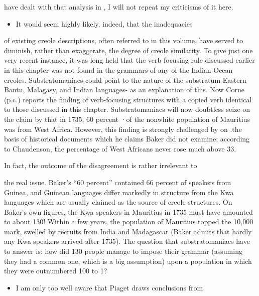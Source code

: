 
have dealt with that analysis in \citet{Bickerton1980}, I will not repeat my criticisms of it here.

\begin{itemize}
\item It would seem highly likely, indeed, that the inadequacies
\end{itemize}

of existing creole descriptions, often referred to in this volume, have served to diminish, rather than exaggerate, the degree of creole simi\-larity. To give just one very recent instance, it was long held that the verb-focusing rule discussed earlier in this chapter was not found in the grammars of any of the Indian Ocean creoles. Substratomaniacs could point to the nature of the substratum-Eastern Bantu, Malagasy, and Indian languages- as an explanation of this. Now Corne (p.c.) reports the finding of verb-focusing structures with a copied verb identical to those discussed in this chapter. Substratomaniacs will now doubtless seize on the claim by \citet{Baker1976} that in 1735, 60 percent ·of the nonwhite population of Mauritius was from West Africa. However, this finding is strongly challenged by \citet{Chaudenson1979} on .the basis of historical documents which he claims Baker did not examine; according to Chaudenson, the percentage of West Africans never rose much above 33.

In fact, the outcome of the disagreement is rather irrelevant to

the real issue. Baker's ``60 percent'' contained 66 percent of speakers from Guinea, and Guinean languages differ markedly in structure from the Kwa languages which are usually claimed as the source of creole structures. On Baker's own figures, the Kwa speakers in Mauritius in 1735 must have amounted to about 130! Within a few years, the population of Mauritius topped the 10,000 mark, swelled by recruits from India and Madagascar (Baker admits that hardly any Kwa speakers arrived after 1735). The question that substratomaniacs have to answer is: how did 130 people manage to impose their grammar (assuming they had a common one, which is a big assumption) upon a population in which they were outnumbered 100 to 1?

\begin{itemize}
\item I am only too well aware that Piaget draws conclusions from
\end{itemize}


